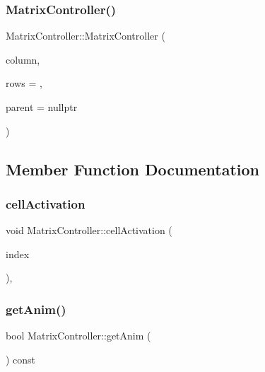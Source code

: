 \subsubsection{\texorpdfstring{Matrix\+Controller()}{MatrixController()}}
{\footnotesize\ttfamily Matrix\+Controller\+::\+Matrix\+Controller (\begin{DoxyParamCaption}\item[{int}]{column,  }\item[{int}]{rows = {},  }\item[{Q\+Widget $\ast$}]{parent = {\ttfamily nullptr} }\end{DoxyParamCaption})}



\subsection{Member Function Documentation}
\mbox{\label{class_matrix_controller_a5cd29184a9f7e7e02a5c3b2baa993aba}} 
\subsubsection{\texorpdfstring{cell\+Activation}{cellActivation}}
{\footnotesize\ttfamily void Matrix\+Controller\+::cell\+Activation (\begin{DoxyParamCaption}\item[{Q\+Model\+Index}]{index }\end{DoxyParamCaption})\hspace{0.3cm}{\ttfamily [private]}, {\ttfamily [slot]}}

\mbox{\label{class_matrix_controller_a3dddffef3dba0b1ec308c328c23c2133}} 
\subsubsection{\texorpdfstring{get\+Anim()}{getAnim()}}
{\footnotesize\ttfamily bool Matrix\+Controller\+::get\+Anim (\begin{DoxyParamCaption}{ }\end{DoxyParamCaption}) const\hspace{0.3cm}{\ttfamily [inline]}}

